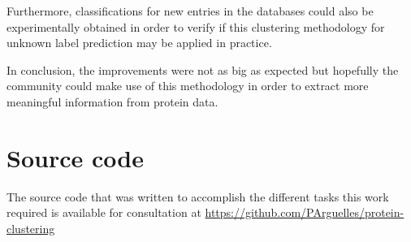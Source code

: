 Furthermore, classifications for new entries in the databases could also be experimentally obtained in order to verify if this clustering methodology for unknown label prediction may be applied in practice.

In conclusion, the improvements were not as big as expected but hopefully the community could make use of this methodology in order to extract more meaningful information from protein data.

\section{Source code}

The source code that was written to accomplish the different tasks this work required is available for consultation at \url{https://github.com/PArguelles/protein-clustering} 
